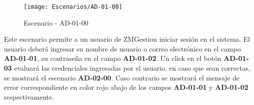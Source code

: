 \begin{figure}[H]
\centering
\texttt{[image: Escenarios/AD-01-00]}
\caption{Escenario - AD-01-00}
\label{fig:AD-01-00}
\end{figure}
    Este escenario permite a un usuario de ZMGestion iniciar sesión en el sistema. El usuario deberá ingresar su nombre de usuario o correo electrónico en el campo \textbf{AD-01-01}, su contraseña en el campo \textbf{AD-01-02}. Un click en el botón \textbf{AD-01-03} evaluará las credenciales ingresadas por el usuario, en caso que sean correctas, se mostrará el escenario \textbf{AD-02-00}. Caso contrario se mostrará el mensaje de error correspondiente en color rojo abajo de los campos \textbf{AD-01-01} y \textbf{AD-01-02} respectivamente.
\\